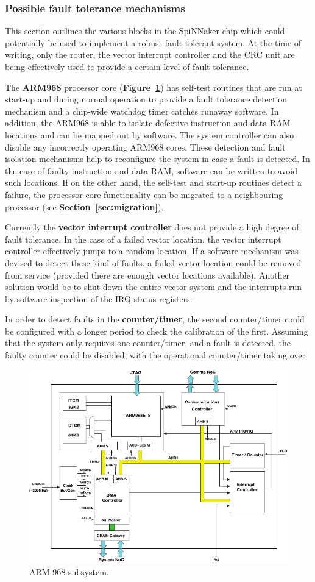\documentclass[a4paper, 11pt]{article}
\begin{document}
\subsubsection{Possible fault tolerance mechanisms}
This section outlines the various blocks in the SpiNNaker chip which could potentially be used to implement a robust fault tolerant system. At the time of writing, only the router, the vector interrupt controller and the CRC unit are being effectively used to provide a certain level of fault tolerance.

The \textbf{ARM968} processor core (\textbf{Figure~\ref{fig:arm968}}) has self-test routines that are run at start-up and during normal operation to provide a fault tolerance detection mechanism and a chip-wide watchdog timer catches runaway software. In addition, the ARM968 is able to isolate defective instruction and data RAM locations and can be mapped out by software. The system controller can also disable any incorrectly operating ARM968 cores. These detection and fault isolation mechanisms help to reconfigure the system in case a fault is detected. In the case of faulty instruction and data RAM, software can be written to avoid such locations. If on the other hand, the self-test and start-up routines detect a failure, the processor core functionality can be migrated to a neighbouring processor (see \textbf{Section~\ref{sec:migration}}).

Currently the \textbf{vector interrupt controller} does not provide a high degree of fault tolerance. In the case of a failed vector location, the vector interrupt controller effectively jumps to a random location. If a software mechanism was devised to detect these kind of faults, a failed vector location could be removed from service (provided there are enough vector locations available). Another solution would be to shut down the entire vector system and the interrupts run by software inspection of the IRQ status registers.

In order to detect faults in the \textbf{counter/timer}, the second counter/timer could be configured with a longer period to check the calibration of the first. Assuming that the system only requires one counter/timer, and a fault is detected, the faulty counter could be disabled, with the operational counter/timer taking over.

\begin{figure}[t]
	\centering
	\includegraphics[width=0.55\linewidth]{images/arm968_subsystem.pdf}
	\caption{ARM 968 subsystem.}
	\label{fig:arm968}
\end{figure}
\end{document}
